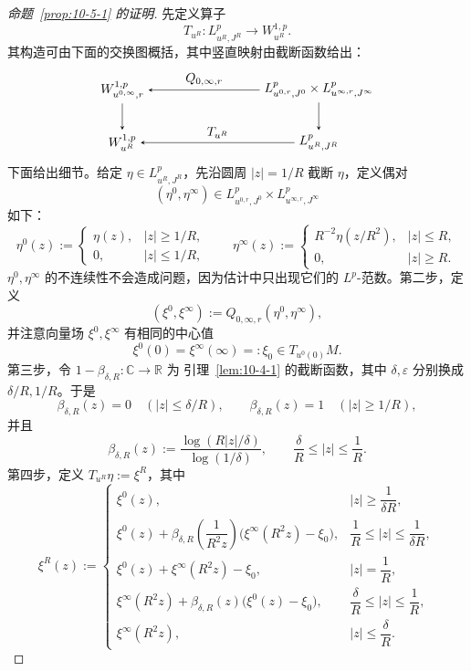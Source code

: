 \begin{proof}[命题~\ref{prop:10-5-1} 的证明]
先定义算子
\[
  T_{u^R}:L_{u^R,J^R}^p\longrightarrow W_{u^R}^{1,p}.
\]
其构造可由下面的交换图概括，其中竖直映射由截断函数给出：
\begin{equation}\label{eq:10-5-3}
\begin{tikzpicture}[baseline=(current bounding box.center),>=stealth]
  \node (wt) at (0,1.45) {$W_{u^{0,\infty},r}^{1,p}$};
  \node (lt) at (5.4,1.45)
    {$L_{u^{0,r},J^0}^p\times L_{u^{\infty,r},J^\infty}^p$};
  \node (wb) at (0,0) {$W_{u^R}^{1,p}$};
  \node (lb) at (5.4,0) {$L_{u^R,J^R}^p$};
  \draw[<-] (wt) -- node[above] {$Q_{0,\infty,r}$} (lt);
  \draw[->] (wt) -- (wb);
  \draw[->] (lt) -- (lb);
  \draw[<-] (wb) -- node[above] {$T_{u^R}$} (lb);
\end{tikzpicture}
\end{equation}
下面给出细节。给定 $\eta\in L_{u^R,J^R}^p$，先沿圆周 $|z|=1/R$
截断 $\eta$，定义偶对
\[
  (\eta^0,\eta^\infty)
  \in L_{u^{0,r},J^0}^p\times L_{u^{\infty,r},J^\infty}^p
\]
如下：
\[
  \eta^0(z):=
  \begin{cases}
    \eta(z),&|z|\ge1/R,\\
    0,&|z|\le1/R,
  \end{cases}
  \qquad
  \eta^\infty(z):=
  \begin{cases}
    R^{-2}\eta(z/R^2),&|z|\le R,\\
    0,&|z|\ge R.
  \end{cases}
\]
$\eta^0,\eta^\infty$ 的不连续性不会造成问题，因为估计中只出现它们的
$L^p$-范数。第二步，定义
\[
  (\xi^0,\xi^\infty):=
  Q_{0,\infty,r}(\eta^0,\eta^\infty),
\]
并注意向量场 $\xi^0,\xi^\infty$ 有相同的中心值
\[
  \xi^0(0)=\xi^\infty(\infty)=:\xi_0\in T_{u^0(0)}M.
\]
第三步，令 $1-\beta_{\delta,R}:\mathbb C\to\mathbb R$ 为
引理~\ref{lem:10-4-1} 的截断函数，其中 $\delta,\varepsilon$ 分别换成
$\delta/R,1/R$。于是
\[
  \beta_{\delta,R}(z)=0\quad(|z|\le\delta/R),\qquad
  \beta_{\delta,R}(z)=1\quad(|z|\ge1/R),
\]
并且
\[
  \beta_{\delta,R}(z)
  :=\frac{\log(R|z|/\delta)}{\log(1/\delta)},
  \qquad \frac{\delta}{R}\le|z|\le\frac1R.
\]
第四步，定义 $T_{u^R}\eta:=\xi^R$，其中
\begin{equation}\label{eq:10-5-4}
\xi^R(z):=
\begin{cases}
\xi^0(z),
  & |z|\ge\dfrac1{\delta R},\\[3pt]
\xi^0(z)+\beta_{\delta,R}\!\left(\dfrac1{R^2z}\right)
  \bigl(\xi^\infty(R^2z)-\xi_0\bigr),
  & \dfrac1R\le|z|\le\dfrac1{\delta R},\\[6pt]
\xi^0(z)+\xi^\infty(R^2z)-\xi_0,
  & |z|=\dfrac1R,\\[3pt]
\xi^\infty(R^2z)+\beta_{\delta,R}(z)\bigl(\xi^0(z)-\xi_0\bigr),
  & \dfrac{\delta}{R}\le|z|\le\dfrac1R,\\[6pt]
\xi^\infty(R^2z),
  & |z|\le\dfrac{\delta}{R}.
\end{cases}
\end{equation}


\end{proof}
